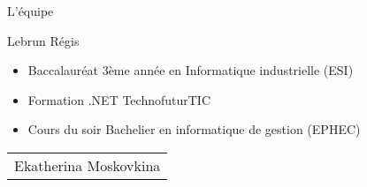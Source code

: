 \begin{frame}{L'équipe}
\begin{minipage}{0.45\textwidth}
Lebrun Régis
\begin{itemize}
  \item Baccalauréat 3ème année en Informatique industrielle (ESI)
  \item Formation .NET TechnofuturTIC
  \item Cours du soir Bachelier en informatique de gestion (EPHEC)
\end{itemize}
\end{minipage}%
\hfill
\begin{minipage}{0.45\textwidth}
\begin{tabular}{|p{\textwidth}}
Ekatherina Moskovkina
\end{tabular}
\end{minipage}%
\end{frame}
